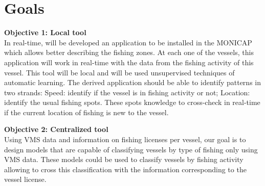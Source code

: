 


\section{Goals} %
\label{sec:objectives}

 \textbf{Objective 1: Local tool} \\
In real-time, will be developed an application to be installed in the MONICAP which allows better describing the fishing zones. At each one of the vessels, this application will work in real-time with the data from the fishing activity of this vessel. This tool will be local and will be used unsupervised techniques of automatic learning.
The derived application should be able to identify patterns in two strands:
Speed: identify if the vessel is in fishing activity or not;
Location: identify the usual fishing spots. These spots knowledge to cross-check in real-time if the current location of fishing is new to the vessel.

 \textbf{Objective 2: Centralized tool} \\
Using VMS data and information on fishing licenses per vessel, our goal is to design models that are capable of classifying vessels by type of fishing only using VMS data. These models could be used to classify vessels by fishing activity allowing to cross this classification with the information corresponding to the vessel license.


